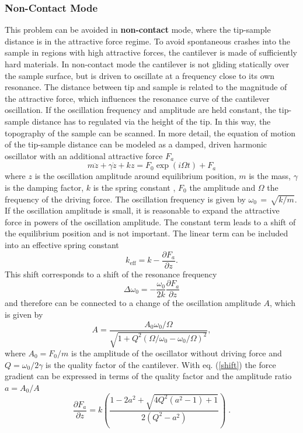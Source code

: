 \documentclass[a4paper]{scrartcl}
\numberwithin{equation}{section}
\numberwithin{figure}{section}
\numberwithin{table}{section}
\newcommand{\eq}[2]{\begin{equation}#1\label{#2}\end{equation}}
\newcommand{\Formel}[1]{(\ref{#1})}
\begin{document}
\subsubsection*{Non-Contact Mode}
This problem can be avoided in \textbf{non-contact} mode, where the tip-sample distance is in the attractive force regime. To avoid spontaneous crashes into the sample in regions with high attractive forces, the cantilever is made of sufficiently hard materials. In non-contact mode the cantilever is not gliding statically over the sample surface, but is driven to oscillate at a frequency close to its own resonance. The distance between tip and sample is related to the magnitude of the attractive force, which influences the resonance curve of the cantilever oscillation. If the oscillation frequency and amplitude are held constant, the tip-sample distance has to regulated via the height of the tip. In this way, the topography  of the sample can be scanned. In more detail, the equation of motion of the tip-sample distance can be modeled as a damped, driven harmonic oscillator with an additional attractive force $F_a$
\begin{equation}
m\ddot{z}+\gamma \dot{z}+kz=F_{0} \exp( {i \Omega t})+F_{a} \label{eq:differential}
\end{equation}
where $z$ is the oscillation amplitude around equilibrium position, $m$ is the mass, $\gamma$ is the damping factor, $k$ is the spring constant , $F_0$  the amplitude and $\Omega$ the frequency of the driving force. The oscillation frequency is given by $\omega_0\,=\,\sqrt{k/m}$. If the oscillation amplitude is small, it is reasonable to expand the attractive force in powers of the oscillation amplitude. The constant term leads to a shift of the equilibrium position and is not important. The linear term can be included into an effective spring constant
\begin{equation}
k_\text{eff}=k-\frac{\partial F_{a}}{\partial z} \label{eq:change}.
\end{equation}
This shift corresponds to a shift of the resonance frequency 
\eq{\Delta \omega_0 = -\frac{\omega_0}{2 k} \frac{\partial F_a}{\partial z} }{shift}
and therefore can be connected to a change of the oscillation amplitude $A$, which is given by \cite{martin}
\begin{equation}
A=\frac{ A_0 \omega_0 / \Omega  }  { \sqrt{1 + Q^2(\Omega / \omega_0 - \omega_0 / \Omega )^2 }  } ,
\end{equation}
where $A_0=F_0/m$ is the amplitude of the oscillator without driving force and $Q=\omega_0/2\gamma$ is the quality factor of the cantilever. With eq. \Formel{shift} the force gradient can be expressed in terms of the quality factor and the amplitude ratio $a=A_0/A$
\begin{equation}
\frac{\partial F_{a}}{\partial z}=k\left(\frac{1-2a^{2}+\sqrt{4Q^{2}\left(a^{2}-1\right)+1}}{2\left(Q^{2}-a^{2}\right)}\right) \; .
\end{equation}
\end{document}
